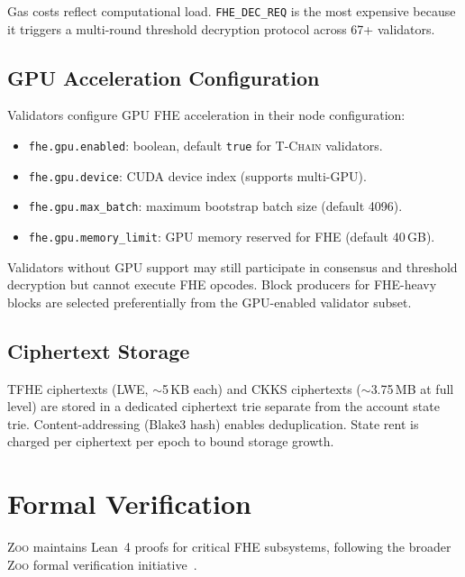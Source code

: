 \documentclass[11pt,letterpaper]{article}
\theoremstyle{definition}
\theoremstyle{remark}
\newcommand{\Zoo}{\textsc{Zoo}}
\newcommand{\TChain}{\textsc{T-Chain}}
\newcommand{\TFHE}{\textsc{TFHE}}
\newcommand{\CKKS}{\textsc{CKKS}}
\begin{document}
Gas costs reflect computational load. \texttt{FHE\_DEC\_REQ} is the most expensive because it triggers a multi-round threshold decryption protocol across 67+ validators.

\subsection{GPU Acceleration Configuration}

Validators configure GPU FHE acceleration in their node configuration:

\begin{itemize}
  \item \texttt{fhe.gpu.enabled}: boolean, default \texttt{true} for \TChain{} validators.
  \item \texttt{fhe.gpu.device}: CUDA device index (supports multi-GPU).
  \item \texttt{fhe.gpu.max\_batch}: maximum bootstrap batch size (default 4096).
  \item \texttt{fhe.gpu.memory\_limit}: GPU memory reserved for FHE (default 40\,GB).
\end{itemize}

Validators without GPU support may still participate in consensus and threshold decryption but cannot execute FHE opcodes. Block producers for FHE-heavy blocks are selected preferentially from the GPU-enabled validator subset.

\subsection{Ciphertext Storage}

\TFHE{} ciphertexts (LWE, $\sim$5\,KB each) and \CKKS{} ciphertexts ($\sim$3.75\,MB at full level) are stored in a dedicated ciphertext trie separate from the account state trie. Content-addressing (Blake3 hash) enables deduplication. State rent is charged per ciphertext per epoch to bound storage growth.

\section{Formal Verification}
\label{sec:formal}

\Zoo{} maintains Lean~4 proofs for critical FHE subsystems, following the broader \Zoo{} formal verification initiative~\cite{zoo-network-architecture}.
\end{document}
